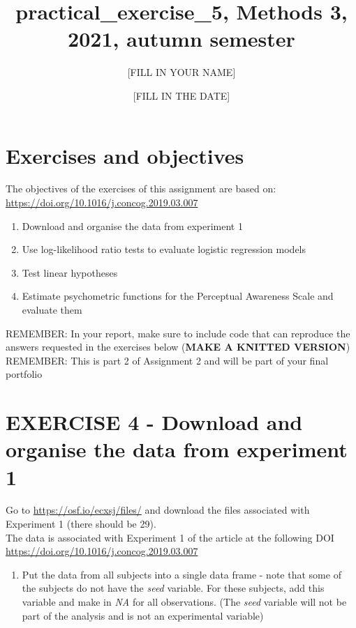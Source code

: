 \documentclass[
]{article}
\title{practical\_exercise\_5, Methods 3, 2021, autumn semester}
\author{{[}FILL IN YOUR NAME{]}}
\date{{[}FILL IN THE DATE{]}}
\providecommand{\tightlist}{%
  \setlength{\itemsep}{0pt}\setlength{\parskip}{0pt}}
\begin{document}
\maketitle

\hypertarget{exercises-and-objectives}{%
\section{Exercises and objectives}\label{exercises-and-objectives}}

The objectives of the exercises of this assignment are based on:
\url{https://doi.org/10.1016/j.concog.2019.03.007}

\begin{enumerate}
\def\labelenumi{\arabic{enumi})}
\setcounter{enumi}{3}
\tightlist
\item
  Download and organise the data from experiment 1\\
\item
  Use log-likelihood ratio tests to evaluate logistic regression
  models\\
\item
  Test linear hypotheses\\
\item
  Estimate psychometric functions for the Perceptual Awareness Scale and
  evaluate them
\end{enumerate}

REMEMBER: In your report, make sure to include code that can reproduce
the answers requested in the exercises below (\textbf{MAKE A KNITTED
VERSION})\\
REMEMBER: This is part 2 of Assignment 2 and will be part of your final
portfolio

\hypertarget{exercise-4---download-and-organise-the-data-from-experiment-1}{%
\section{EXERCISE 4 - Download and organise the data from experiment
1}\label{exercise-4---download-and-organise-the-data-from-experiment-1}}

Go to \url{https://osf.io/ecxsj/files/} and download the files
associated with Experiment 1 (there should be 29).\\
The data is associated with Experiment 1 of the article at the following
DOI \url{https://doi.org/10.1016/j.concog.2019.03.007}

\begin{enumerate}
\def\labelenumi{\arabic{enumi})}
\tightlist
\item
  Put the data from all subjects into a single data frame - note that
  some of the subjects do not have the \emph{seed} variable. For these
  subjects, add this variable and make in \emph{NA} for all
  observations. (The \emph{seed} variable will not be part of the
  analysis and is not an experimental variable)
\end{enumerate}
\end{document}
